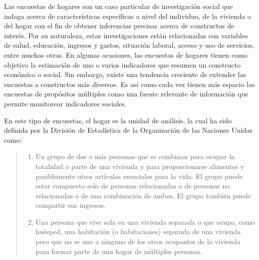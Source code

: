 Las encuestas de hogares son un caso particular de investigación social que indaga acerca de características específicas a nivel del individuo, de la vivienda o del hogar con el fin de obtener inferencias precisas acerca de constructos de interés. Por su naturaleza, estas investigaciones están relacionadas con variables de salud, educación, ingresos y gastos, situación laboral, acceso y uso de servicios, entre muchas otras. En algunas ocasiones, las encuestas de hogares tienen como objetivo la estimación de uno o varios indicadores que resumen un constructo económico o social. Sin embargo, existe una tendencia creciente de extender las encuestas a constructos más diversos. Es así como cada vez tienen más espacio las encuestas de propósitos múltiples como una fuente relevante de información que permite monitorear indicadores sociales.

En este tipo de encuestas, el hogar es la unidad de análisis, la cual ha sido definida por la División de Estadística de la Organización de las Naciones Unidas \citep{United-Nations_2011} como:

\begin{quote}
\begin{enumerate}
\def\labelenumi{\alph{enumi}.}
\tightlist
\item
  Un grupo de dos o más personas que se combinan para ocupar la totalidad o parte de una vivienda y para proporcionarse alimentos y posiblemente otros artículos esenciales para la vida. El grupo puede estar compuesto solo de personas relacionadas o de personas no relacionadas o de una combinación de ambos. El grupo también puede compartir sus ingresos.
\item
  Una persona que vive sola en una vivienda separada o que ocupa, como huésped, una habitación (o habitaciones) separada de una vivienda pero que no se une a ninguno de los otros ocupantes de la vivienda para formar parte de una hogar de múltiples personas.
\end{enumerate}
\end{quote}

